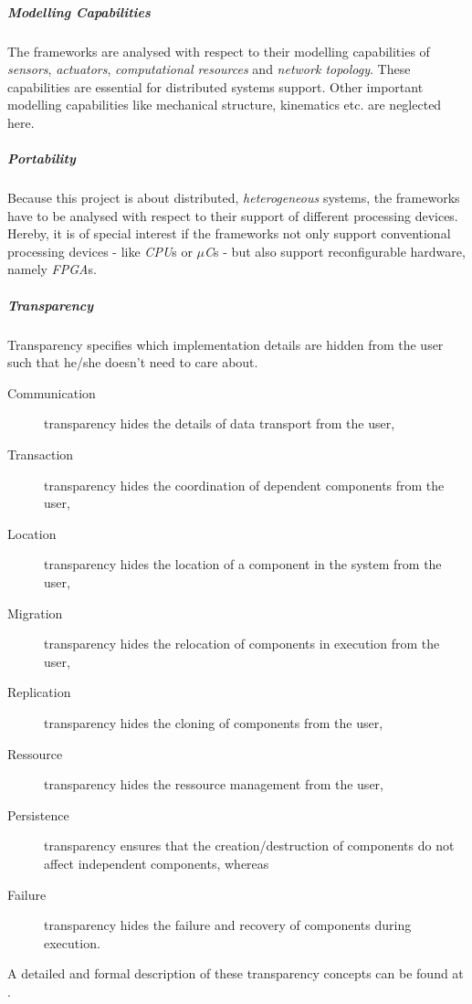 \documentclass[a4paper,twocolumn]{esapub2005} %
\begin{document}

\subparagraph{Modelling Capabilities}
The frameworks are analysed with respect to their modelling capabilities of \emph{sensors}, \emph{actuators}, \emph{computational resources} and \emph{network topology}.
These capabilities are essential for distributed systems support.
Other important modelling capabilities like mechanical structure, kinematics etc. are neglected here.

\subparagraph{Portability}
Because this project is about distributed, \emph{heterogeneous} systems, the frameworks have to be analysed with respect to their support of different processing devices.
Hereby, it is of special interest if the frameworks not only support conventional processing devices - like \emph{CPU}s or \emph{$\mu$C}s - but also support reconfigurable hardware, namely \emph{FPGA}s.

\subparagraph{Transparency}
Transparency specifies which implementation details are hidden from the user such that he/she doesn't need to care about.
\begin{description}
\item[Communication] transparency hides the details of data transport from the user,
\item[Transaction] transparency hides the coordination of dependent components from the user,
\item[Location] transparency hides the location of a component in the system from the user,
\item[Migration] transparency hides the relocation of components in execution from the user,
\item[Replication] transparency hides the cloning of components from the user,
\item[Ressource] transparency hides the ressource management from the user,
\item[Persistence] transparency ensures that the creation/destruction of components do not affect independent components,
whereas \item[Failure] transparency hides the failure and recovery of components during execution.
\end{description}
A detailed and formal description of these transparency concepts can be found at \cite{RM-ODP}.

\end{document}

